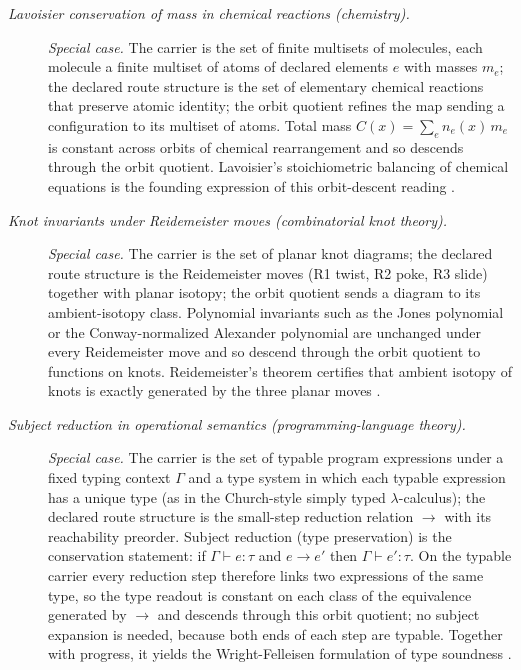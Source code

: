 \begingroup\small
\begin{description}
\item[\emph{Lavoisier conservation of mass in chemical
reactions (chemistry).}] \textit{Special case.}
The carrier is the set of finite multisets of molecules, each molecule a finite multiset of atoms of declared elements \(e\) with masses \(m_e\); the declared route structure
is the set of elementary chemical reactions that
preserve atomic identity; the orbit quotient refines the map sending a
configuration to its multiset of atoms.  Total mass
\(C(x)=\sum_e n_e(x)\,m_e\) is constant across orbits
of chemical rearrangement and so descends through the
orbit quotient.  Lavoisier's stoichiometric balancing
of chemical equations is the founding expression of
this orbit-descent reading \citep{Lavoisier1789Traite}.

\item[\emph{Knot invariants under Reidemeister moves
(combinatorial knot theory).}] \textit{Special case.}
The carrier is the set of planar knot diagrams; the
declared route structure is the Reidemeister moves (R1
twist, R2 poke, R3 slide) together with planar isotopy;
the orbit quotient sends a diagram to its
ambient-isotopy class.  Polynomial invariants such as
the Jones polynomial or the Conway-normalized Alexander polynomial are unchanged under
every Reidemeister move and so descend through the
orbit quotient to functions on knots.  Reidemeister's
theorem certifies that ambient isotopy of knots is
exactly generated by the three planar moves
\citep{Reidemeister1927Knotentheorie}.

\item[\emph{Subject reduction in operational semantics
(programming-language theory).}] \textit{Special case.}
The carrier is the set of typable program expressions
under a fixed typing context \(\Gamma\) and a type
system in which each typable expression has a unique type (as in the
Church-style simply typed \(\lambda\)-calculus); the declared route structure is the small-step
reduction relation \(\to\) with its reachability
preorder.  Subject reduction (type preservation) is the
conservation statement: if
\(\Gamma\vdash e:\tau\) and \(e\to e'\) then
\(\Gamma\vdash e':\tau\).  On the typable carrier every reduction step therefore links
two expressions of the same type, so the type readout is constant on
each class of the equivalence generated by \(\to\) and descends
through this orbit quotient; no subject expansion is needed, because
both ends of each step are typable.  Together with progress, it yields
the Wright-Felleisen formulation of type soundness
\citep{WrightFelleisen1994SyntacticTypeSoundness}.


\end{description}
